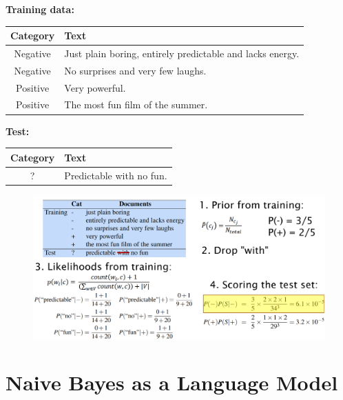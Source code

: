 \documentclass{book}
\begin{document}
\textbf{Training data:} 

\begin{table}[h]
\centering
\begin{tabular}{|c|p{}|}
\hline
\textbf{Category} & \textbf{Text} \\
\hline
Negative & Just plain boring, entirely predictable and lacks energy. \\
\hline
Negative & No surprises and very few laughs. \\
\hline
Positive & Very powerful. \\
\hline
Positive & The most fun film of the summer. \\
\hline
\end{tabular}
\end{table}


\textbf{Test:} 
\begin{table}[h]
\centering
\begin{tabular}{|c|p{}|}
\hline
\textbf{Category} & \textbf{Text} \\
\hline
? & Predictable with no fun. \\
\hline
\end{tabular}
\end{table}

\begin{figure}[h]
\includegraphics[scale = 0.23]{pics/naive_example.png}
\end{figure}


\section{Naive Bayes as a Language Model}
\end{document}
